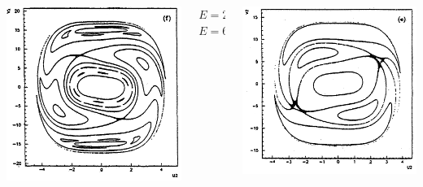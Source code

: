 \documentclass[a4,compress]{beamer}
\begin{document}
\begin{frame}
\begin{columns}[c]
\begin{column}{0.35\textwidth}
    \includegraphics[height=0.45\textheight]{ponicare-sections-e_600}
  \end{column}
  \begin{column}{0.15\textwidth}
    \small \centering \(E = 240A\) \\
    \vspace{3cm}
    \(E = 600A\)
  \end{column}
  \begin{column}{0.33\textwidth}
    \includegraphics[height=0.45\textheight]{ponicare-sections-e_400}


\end{column}
\end{columns}
\end{frame}
\end{document}
